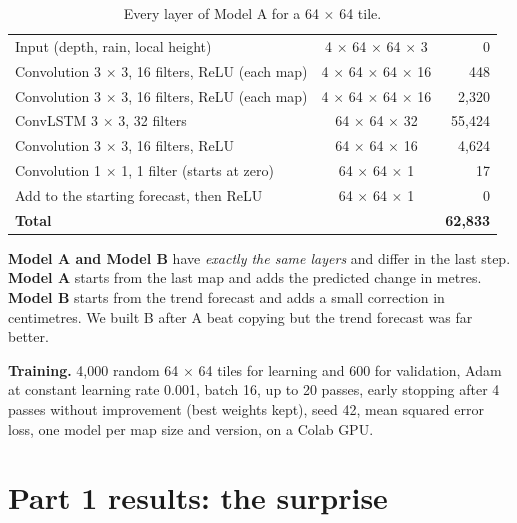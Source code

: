 \begin{table}[!htbp]
\centering\small
\caption{Every layer of Model A for a 64 $\times$ 64 tile.}
\begin{tabularx}{\linewidth}{|Y|c|r|}
\hline
{}  &  & \\ \hline
Input (depth, rain, local height) & 4 $\times$ 64 $\times$ 64 $\times$ 3 & 0\\ \hline
Convolution 3 $\times$ 3, 16 filters, ReLU (each map) & 4 $\times$ 64 $\times$ 64 $\times$ 16 & 448\\ \hline
Convolution 3 $\times$ 3, 16 filters, ReLU (each map) & 4 $\times$ 64 $\times$ 64 $\times$ 16 & 2,320\\ \hline
ConvLSTM 3 $\times$ 3, 32 filters & 64 $\times$ 64 $\times$ 32 & 55,424\\ \hline
Convolution 3 $\times$ 3, 16 filters, ReLU & 64 $\times$ 64 $\times$ 16 & 4,624\\ \hline
Convolution 1 $\times$ 1, 1 filter (starts at zero) & 64 $\times$ 64 $\times$ 1 & 17\\ \hline
Add to the starting forecast, then ReLU & 64 $\times$ 64 $\times$ 1 & 0\\ \hline
\textbf{Total} & & \textbf{62,833}\\ \hline
\end{tabularx}
\end{table}

\textbf{Model A and Model B} have \emph{exactly the same layers} and differ in the last step. \textbf{Model A} starts from the last map and adds the predicted change in metres. \textbf{Model B} starts from the trend forecast and adds a small correction in centimetres. We built B after A beat copying but the trend forecast was far better.

\textbf{Training.} 4,000 random 64 $\times$ 64 tiles for learning and 600 for validation, Adam at constant learning rate 0.001, batch 16, up to 20 passes, early stopping after 4 passes without improvement (best weights kept), seed 42, mean squared error loss, one model per map size and version, on a Colab GPU.

\section{Part 1 results: the surprise}\label{ch:res1}

